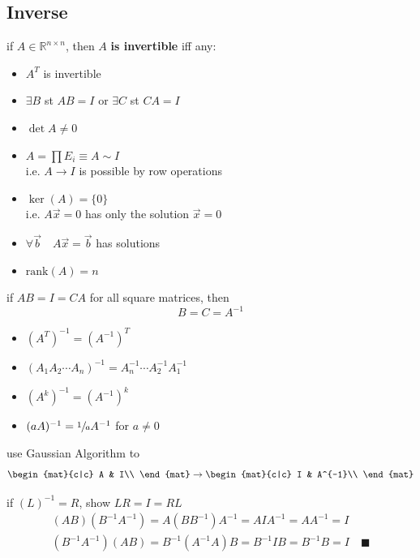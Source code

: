 	\subsection{Inverse}
		\begin{definition}
			if $A\in\mathbb{R}^{n\times n}$, then $A$ \textbf{is invertible} iff any:
			\begin{itemize}
				\item $A^T$ is invertible
				\item $\exists B$ st $AB=I$ or $\exists C$ st $CA=I$
				\item $\det A\ne0$
				\item $A=\prod E_i\equiv A\sim I$\\i.e. $A\to I$ is possible by row operations 
				\item $\ker(A)=\{0\}$\\i.e. $A\vec x=0$ has only the solution $\vec x=0$ 
				\item $\forall\vec b\quad A\vec x=\vec b$ has solutions 
				\item $\mathrm{rank}(A)=n$
			\end{itemize}
			if $AB=I=CA$ for all square matrices, then
			$$B=C=A^{-1}$$
		\end{definition}
		\begin{theorem}
			\begin{itemize}
				\item $(A^T)^{-1}=(A^{-1})^T$ 
				\item $(A_1A_2\cdots A_n)^{-1}=A_n^{-1}\cdots A_2^{-1}A_1^{-1}$
				\item $(A^k)^{-1}=(A^{-1})^k$
				\item $(aA)^{-1}=\sfrac1aA^{-1}$ for $a\ne0$
			\end{itemize}
		\end{theorem}
		\begin{algorithm}
			use Gaussian Algorithm to
			$$\begin{mat}{c|c} A & I\\ \end{mat}\rightarrow\begin{mat}{c|c} I & A^{-1}\\ \end{mat}$$
		\end{algorithm}
		\begin{example}
			[Prove if $A,B$ are invertible, then $(AB)^{-1}=B^{-1}A^{-1}$]
			if $(L)^{-1}=R$, show $LR=I=RL$
			\begin{align*}
				(AB)(B^{-1}A^{-1})=A(BB^{-1})A^{-1}=AIA^{-1}=AA^{-1}=I\\
				(B^{-1}A^{-1})(AB)=B^{-1}(A^{-1}A)B=B^{-1}IB=B^{-1}B=I\quad\blacksquare\\
			\end{align*}
		\end{example}
